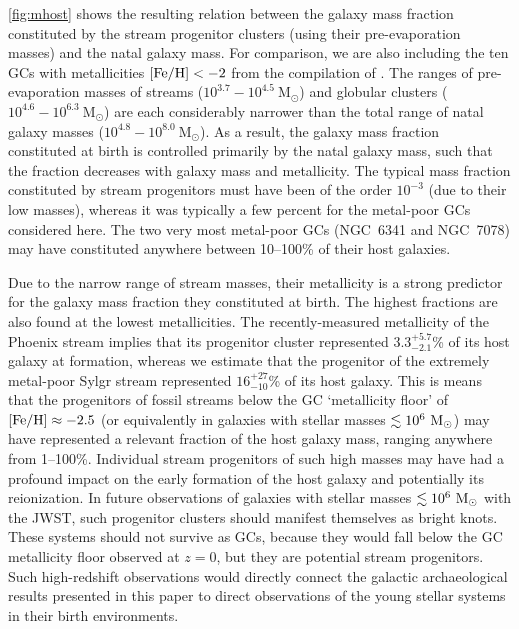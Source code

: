 \documentclass[twocolumn]{aastex63}
\newcommand{\msun}{\ensuremath{\textrm{M}_\odot}}
\begin{document}
\autoref{fig:mhost} shows the resulting relation between the galaxy mass fraction constituted by the stream progenitor clusters (using their pre-evaporation masses) and the natal galaxy mass. For comparison, we are also including the ten GCs with metallicities $[{\rm Fe}/{\rm H}]<-2$ from the compilation of \citet{kruijssen19e}. The ranges of pre-evaporation masses of streams ($10^{3.7}{-}10^{4.5}~\msun$) and globular clusters ($10^{4.6}{-}10^{6.3}~\msun$) are each considerably narrower than the total range of natal galaxy masses ($10^{4.8}{-}10^{8.0}~\msun$). As a result, the galaxy mass fraction constituted at birth is controlled primarily by the natal galaxy mass, such that the fraction decreases with galaxy mass and metallicity. The typical mass fraction constituted by stream progenitors must have been of the order $10^{-3}$ (due to their low masses), whereas it was typically a few percent for the metal-poor GCs considered here. The two very most metal-poor GCs (NGC~6341 and NGC~7078) may have constituted anywhere between 10--100\% of their host galaxies.

Due to the narrow range of stream masses, their metallicity is a strong predictor for the galaxy mass fraction they constituted at birth. The highest fractions are also found at the lowest metallicities. The recently-measured metallicity of the Phoenix stream \citep{wan20} implies that its progenitor cluster represented $3.3_{-2.1}^{+5.7}$\% of its host galaxy at formation, whereas we estimate that the progenitor of the extremely metal-poor Sylgr stream \citep{ibata:2019,roederer:2019} represented $16_{-10}^{+27}$\% of its host galaxy. This is means that the progenitors of fossil streams below the GC `metallicity floor' \citep{beasley:2019,kruijssen19c} of $[{\rm Fe}/{\rm H}]\approx-2.5$ (or equivalently in galaxies with stellar masses $\la10^6~\msun$) may have represented a relevant fraction of the host galaxy mass, ranging anywhere from 1--100\%. Individual stream progenitors of such high masses may have had a profound impact on the early formation of the host galaxy and potentially its reionization. In future observations of galaxies with stellar masses $\la10^6~\msun$ with the JWST, such progenitor clusters should manifest themselves as bright knots. These systems should not survive as GCs, because they would fall below the GC metallicity floor observed at $z=0$, but they are potential stream progenitors. Such high-redshift observations would directly connect the galactic archaeological results presented in this paper to direct observations of the young stellar systems in their birth environments.
\end{document}
